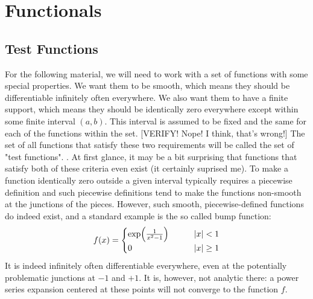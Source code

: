 \section{Functionals} 

\subsection{Test Functions}
For the following material, we will need to work with a set of functions with some special properties. We want them to be smooth, which means they should be differentiable infinitely often everywhere. We also want them to have a finite support, which means they should be identically zero everywhere except within some finite interval $(a,b)$. This interval is assumed to be fixed and the same for each of the functions within the set. [VERIFY! Nope! I think, that's wrong!] The set of all functions that satisfy these two requirements will be called the set of "test functions". . At first glance, it may be a bit surprising that functions that satisfy both of these criteria even exist (it certainly suprised me). To make a function identically zero outside a given interval typically requires a piecewise definition and such piecewise definitions tend to make the functions non-smooth at the junctions of the pieces. However, such smooth, piecewise-defined functions do indeed exist, and a standard example is the so called bump function:
\begin{equation}
f(x) = 
 \begin{cases}
 \exp \Bigl( \frac{1}{x^2-1} \Bigr)  \qquad &  |x|   <  1 \\
 0                                   \qquad &  |x| \geq 1
 \end{cases}
\end{equation}
It is indeed infinitely often differentiable everywhere, even at the potentially problematic junctions at $-1$ and $+1$. It is, however, not analytic there: a power series expansion centered at these points will not converge to the function $f$.




